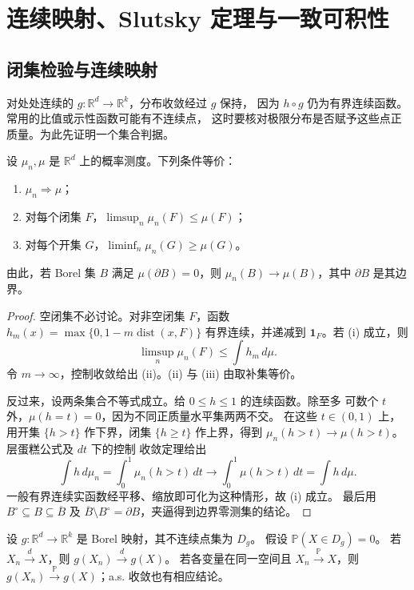 \section{连续映射、Slutsky 定理与一致可积性}
\label{sec:continuous-mapping-slutsky-ui}

\subsection{闭集检验与连续映射}

对处处连续的 $g:\mathbb R^d\to\mathbb R^k$，分布收敛经过 $g$ 保持，
因为 $h\circ g$ 仍为有界连续函数。常用的比值或示性函数可能有不连续点，
这时要核对极限分布是否赋予这些点正质量。为此先证明一个集合判据。

\begin{theorem}[闭集与开集判据]
\label{thm:probability-portmanteau}
设 $\mu_n,\mu$ 是 $\mathbb R^d$ 上的概率测度。下列条件等价：
\begin{enumerate}[label=\textup{(\roman*)}]
\item $\mu_n\Rightarrow\mu$；
\item 对每个闭集 $F$，$\limsup_n\mu_n(F)\le\mu(F)$；
\item 对每个开集 $G$，$\liminf_n\mu_n(G)\ge\mu(G)$。
\end{enumerate}
由此，若 Borel 集 $B$ 满足 $\mu(\partial B)=0$，则
$\mu_n(B)\to\mu(B)$，其中 $\partial B$ 是其边界。
\end{theorem}

\begin{proof}
空闭集不必讨论。对非空闭集 $F$，函数
$h_m(x)=\max\{0,1-m\operatorname{dist}(x,F)\}$ 有界连续，并递减到
$\mathbf1_F$。若 (i) 成立，则
\[
 \limsup_n\mu_n(F)\le\int h_m\,d\mu.
\]
令 $m\to\infty$，控制收敛给出 (ii)。(ii) 与 (iii) 由取补集等价。

反过来，设两条集合不等式成立。给 $0\le h\le1$ 的连续函数。除至多
可数个 $t$ 外，$\mu(h=t)=0$，因为不同正质量水平集两两不交。
在这些 $t\in(0,1)$ 上，用开集 $\{h>t\}$ 作下界，闭集 $\{h\ge t\}$
作上界，得到 $\mu_n(h>t)\to\mu(h>t)$。层蛋糕公式及 $dt$ 下的控制
收敛定理给出
\[
 \int h\,d\mu_n=\int_0^1\mu_n(h>t)\,dt
 \longrightarrow\int_0^1\mu(h>t)\,dt=\int h\,d\mu.
\]
一般有界连续实函数经平移、缩放即可化为这种情形，故 (i) 成立。
最后用 $B^\circ\subseteq B\subseteq\overline B$ 及
$\overline B\setminus B^\circ=\partial B$，夹逼得到边界零测集的结论。
\end{proof}

\begin{theorem}[连续映射定理]
\label{thm:probability-continuous-mapping}
设 $g:\mathbb R^d\to\mathbb R^k$ 是 Borel 映射，其不连续点集为 $D_g$。
假设 $\mathbb P(X\in D_g)=0$。
若 $X_n\xrightarrow dX$，则 $g(X_n)\xrightarrow d g(X)$。
若各变量在同一空间且 $X_n\xrightarrow{\mathbb P}X$，则
$g(X_n)\xrightarrow{\mathbb P}g(X)$；a.s. 收敛也有相应结论。
\end{theorem}


